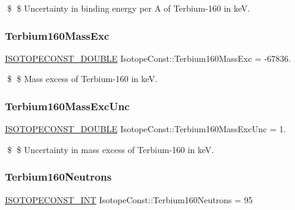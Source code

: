 \$ \$ Uncertainty in binding energy per A of Terbium-\/160 in keV. \mbox{\label{group___isotope_const-_terbium-_tb160_gaaa163c7db9e426a24c9a46fc5c3fe41c}} 
\subsubsection{\texorpdfstring{Terbium160\+Mass\+Exc}{Terbium160MassExc}}
{\footnotesize\ttfamily \mbox{\hyperlink{group___isotope_const-_macros_ga8f45a7272ce02c0b4c65c44636ed719a}{I\+S\+O\+T\+O\+P\+E\+C\+O\+N\+S\+T\+\_\+\+D\+O\+U\+B\+LE}} Isotope\+Const\+::\+Terbium160\+Mass\+Exc = -\/67836.}

\$ \$ Mass excess of Terbium-\/160 in keV. \mbox{\label{group___isotope_const-_terbium-_tb160_ga47c2153b6b83c16c4cf5cf327f677b34}} 
\subsubsection{\texorpdfstring{Terbium160\+Mass\+Exc\+Unc}{Terbium160MassExcUnc}}
{\footnotesize\ttfamily \mbox{\hyperlink{group___isotope_const-_macros_ga8f45a7272ce02c0b4c65c44636ed719a}{I\+S\+O\+T\+O\+P\+E\+C\+O\+N\+S\+T\+\_\+\+D\+O\+U\+B\+LE}} Isotope\+Const\+::\+Terbium160\+Mass\+Exc\+Unc = 1.}

\$ \$ Uncertainty in mass excess of Terbium-\/160 in keV. \mbox{\label{group___isotope_const-_terbium-_tb160_ga1d6cff90fdb1ebc29bb4fb3bbe757907}} 
\subsubsection{\texorpdfstring{Terbium160\+Neutrons}{Terbium160Neutrons}}
{\footnotesize\ttfamily \mbox{\hyperlink{group___isotope_const-_macros_ga5f18360b3e99483a35c32d789e62621c}{I\+S\+O\+T\+O\+P\+E\+C\+O\+N\+S\+T\+\_\+\+I\+NT}} Isotope\+Const\+::\+Terbium160\+Neutrons = 95}

